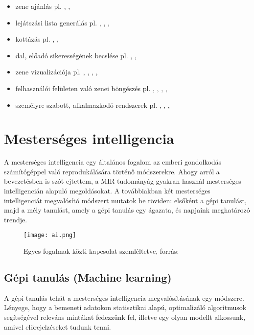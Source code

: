 \begin{itemize}
\begin{itemize}
	\item zene ajánlás pl. \cite{recommend1}, \cite{recommend2}, \cite{recommend3}
	\item lejátszási lista generálás  pl. \cite{playlist1}, \cite{playlist2}, \cite{playlist3}, \cite{playlist4}
	\item kottázás pl. \cite{score1}, \cite{score2}, \cite{score3}
	\item dal, előadó sikerességének becslése pl. \cite{popularity1}, \cite{popularity2}, \cite{popularity3}
	\item zene vizualizációja pl. \cite{visualization1}, \cite{visualization2}, \cite{visualization3}, \cite{visualization4}, \cite{visualization5}
	\item felhasználói felületen való zenei böngészés pl. \cite{ui1}, \cite{ui2}, \cite{ui3}, \cite{ui4}, \cite{ui5}
	\item személyre szabott, alkalmazkodó rendszerek pl. \cite{adaptive1}, \cite{adaptive2}, \cite{adaptive3}, \cite{adaptive4}
	\end{itemize}
\end{itemize}


\section{Mesterséges intelligencia}

A mesterséges intelligencia egy általános fogalom az emberi gondolkodás számítógéppel való reprodukálására történő módszerekre. Ahogy arról a bevezetésben is szót ejtettem, a MIR tudományág gyakran használ mesterséges intelligencián alapuló megoldásokat. A továbbiakban két mesterséges intelligenciát megvalósító módszert mutatok be röviden: elsőként a gépi tanulást, majd a mély tanulást, amely a gépi tanulás egy ágazata, és napjaink meghatározó trendje. \cite{ai}

\begin{figure}[H]
  \texttt{[image: ai.png]}
  \caption{Egyes fogalmak közti kapcsolat szemléltetve, forrás: \cite{ai}}
\end{figure}

\subsection{Gépi tanulás (Machine learning)}

A gépi tanulás tehát a mesterséges intelligencia megvalósításának egy módszere. Lényege, hogy a bemeneti adatokon statisztikai alapú, optimalizáló algoritmusok segítségével releváns mintákat fedezzünk fel, illetve egy olyan modellt alkossunk, amivel előrejelzéseket tudunk tenni. \cite{azure}

